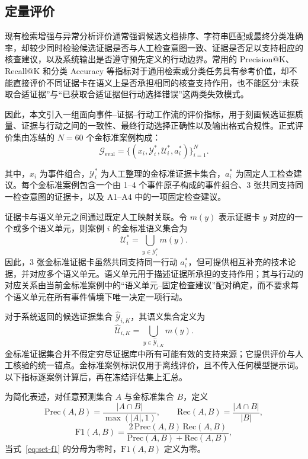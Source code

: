 \subsection{定量评价}

现有检索增强与异常分析评价通常强调候选文档排序、字符串匹配或最终分类准确率，却较少同时检验候选证据是否与人工检查意图一致、证据是否足以支持相应的核查建议，以及系统输出是否遵守预先定义的行动边界。常用的 Precision@K、Recall@K 和分类 Accuracy 等指标对于通用检索或分类任务具有参考价值，却不能直接评价不同证据卡在语义上是否承担相同的核查支持作用，也不能区分“未获取合适证据”与“已获取合适证据但行动选择错误”这两类失效模式。

因此，本文引入一组面向事件--证据--行动工作流的评价指标，用于刻画候选证据质量、证据与行动之间的一致性、最终行动选择正确性以及输出格式合规性。正式评价集由冻结的 \(N=60\) 个金标准案例构成：
\begin{equation}
\mathcal{G}_{\mathrm{eval}}=
\{(x_i,\mathcal{Y}^{*}_i,\mathcal{U}^{*}_i,a^{*}_i)\}_{i=1}^{N}.
\label{eq:evaluation-set}
\end{equation}

其中，\(x_i\) 为事件组合，\(\mathcal{Y}^{*}_i\) 为人工整理的金标准证据卡集合，\(a^{*}_i\) 为固定人工检查建议。每个金标准案例包含一个由 1--4 个事件原子构成的事件组合、3 张共同支持同一检查意图的证据卡，以及 A1--A4 中的一项固定检查建议。

证据卡与语义单元之间通过既定人工映射关联。令 \(m(y)\) 表示证据卡 \(y\) 对应的一个或多个语义单元，则案例 \(i\) 的金标准语义集合为
\begin{equation}
\mathcal{U}^{*}_i=
\bigcup_{y\in\mathcal{Y}^{*}_i}m(y).
\label{eq:gold-semantic-units}
\end{equation}
因此，3 张金标准证据卡虽然共同支持同一行动 \(a_i^{*}\)，但可提供相互补充的技术论据，并对应多个语义单元。语义单元用于描述证据所承担的支持作用；其与行动的对应关系由当前金标准案例中的“语义单元--固定检查建议”配对确定，而不要求每个语义单元在所有事件情境下唯一决定一项行动。

对于系统返回的候选证据集合 \(\hat{\mathcal{Y}}_{i,K}\)，其语义集合定义为
\begin{equation}
\hat{\mathcal{U}}_{i,K}=
\bigcup_{y\in\hat{\mathcal{Y}}_{i,K}}m(y).
\label{eq:predicted-semantic-units}
\end{equation}
金标准证据集合并不假定穷尽证据库中所有可能有效的支持来源；它提供评价与人工核验的统一锚点。金标准案例标识仅用于离线评价，且不传入任何模型提示词。以下指标逐案例计算后，再在冻结评估集上汇总。

为简化表述，对任意预测集合 \(A\) 与金标准集合 \(B\)，定义
\begin{equation}
\mathrm{Prec}(A,B)=\frac{|A\cap B|}{\max(|A|,1)},
\qquad
\mathrm{Rec}(A,B)=\frac{|A\cap B|}{|B|},
\label{eq:set-precision-recall}
\end{equation}
\begin{equation}
\mathrm{F1}(A,B)=
\frac{2\,\mathrm{Prec}(A,B)\,\mathrm{Rec}(A,B)}
{\mathrm{Prec}(A,B)+\mathrm{Rec}(A,B)},
\label{eq:set-f1}
\end{equation}
当式~\eqref{eq:set-f1} 的分母为零时，\(\mathrm{F1}(A,B)\) 定义为零。

